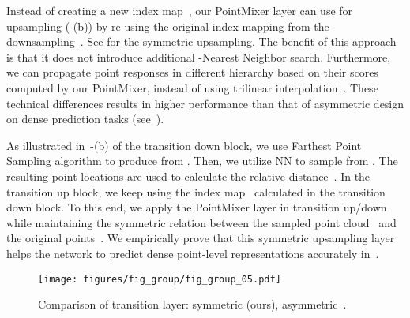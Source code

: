 Instead of creating a new index map~, our PointMixer layer can use  for upsampling (-(\textcolor{black}{b})) by re-using the original index mapping from the downsampling~.
See  for the symmetric upsampling. The benefit of this approach is that it does not introduce additional -Nearest Neighbor search. 
Furthermore, we can propagate point responses in different hierarchy based on their scores computed by our PointMixer, instead of using trilinear interpolation~\cite{pointnet++,point-transformer}. These technical differences results in higher performance than that of asymmetric design on dense prediction tasks (see~).











As illustrated in~-(\textcolor{black}{b}) of the transition down block, we use Farthest Point Sampling algorithm to produce  from . Then, we utilize NN to sample  from . The resulting point locations are used to calculate the relative distance~. In the transition up block, we keep using the index map~ calculated in the transition down block. To this end, we apply the PointMixer layer in transition up/down while maintaining the symmetric relation between the sampled point cloud~ and the original points~. We empirically prove that this symmetric upsampling layer helps the network to predict dense point-level representations accurately in~.
 \begin{figure}[!t]
\centering
\texttt{[image: figures/fig\_group/fig\_group\_05.pdf]}
\vspace{-2mm}
\caption{Comparison of transition layer: symmetric (ours), asymmetric~\cite{pointnet++,zhao2019pointweb,point-transformer}.}
\label{fig:fig_symmetric}
\vspace{-2mm}
\end{figure} 
